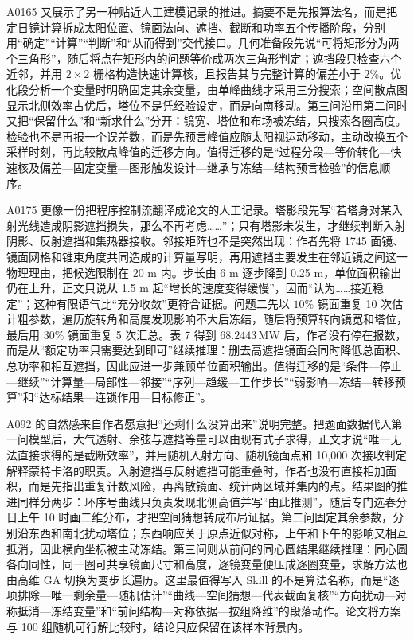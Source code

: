 \documentclass[UTF8,a4paper,12pt]{ctexart}
\begin{document}
A0165 又展示了另一种贴近人工建模记录的推进。摘要不是先报算法名，而是把定日镜计算拆成太阳位置、镜面法向、遮挡、截断和功率五个传播阶段，分别用“确定”“计算”“判断”和“从而得到”交代接口。几何准备段先说“可将矩形分为两个三角形”，随后将点在矩形内的问题等价成两次三角形判定；遮挡段只检查六个近邻，并用 $2\times2$ 栅格构造快速计算核，且报告其与完整计算的偏差小于 $2\%$。优化段分析一个变量时明确固定其余变量，由单峰曲线才采用三分搜索；空间散点图显示北侧效率占优后，塔位不是凭经验设定，而是向南移动。第三问沿用第二问时又把“保留什么”和“新求什么”分开：镜宽、塔位和布场被冻结，只搜索各圈高度。检验也不是再报一个误差数，而是先预言峰值应随太阳视运动移动，主动改换五个采样时刻，再比较散点峰值的迁移方向。值得迁移的是“过程分段—等价转化—快速核及偏差—固定变量—图形触发设计—继承与冻结—结构预言检验”的信息顺序。

A0175 更像一份把程序控制流翻译成论文的人工记录。塔影段先写“若塔身对某入射光线造成阴影遮挡损失，那么不再考虑……”；只有塔影未发生，才继续判断入射阴影、反射遮挡和集热器接收。邻接矩阵也不是突然出现：作者先将 1745 面镜、镜面网格和锥束角度共同造成的计算量写明，再用遮挡主要发生在邻近镜之间这一物理理由，把候选限制在 20 m 内。步长由 6 m 逐步降到 0.25 m，单位面积输出仍在上升，正文只说从 1.5 m 起“增长的速度变得缓慢”，因而“认为……接近稳定”；这种有限语气比“充分收敛”更符合证据。问题二先以 $10\%$ 镜面重复 10 次估计粗参数，遍历旋转角和高度发现影响不大后冻结，随后将预算转向镜宽和塔位，最后用 $30\%$ 镜面重复 5 次汇总。表 7 得到 $68.2443\,\mathrm{MW}$ 后，作者没有停在报数，而是从“额定功率只需要达到即可”继续推理：删去高遮挡镜面会同时降低总面积、总功率和相互遮挡，因此应进一步兼顾单位面积输出。值得迁移的是“条件—停止—继续”“计算量—局部性—邻接”“序列—趋缓—工作步长”“弱影响—冻结—转移预算”和“达标结果—连锁作用—目标修正”。

A092 的自然感来自作者愿意把“还剩什么没算出来”说明完整。把题面数据代入第一问模型后，大气透射、余弦与遮挡等量可以由现有式子求得，正文才说“唯一无法直接求得的是截断效率”，并用随机入射方向、随机镜面点和 10,000 次接收判定解释蒙特卡洛的职责。入射遮挡与反射遮挡可能重叠时，作者也没有直接相加面积，而是先指出重复计数风险，再离散镜面、统计两区域并集内的点。结果图的推进同样分两步：环序号曲线只负责发现北侧高值并写“由此推测”，随后专门选春分日上午 10 时画二维分布，才把空间猜想转成布局证据。第二问固定其余参数，分别沿东西和南北扰动塔位；东西响应关于原点近似对称，上午和下午的影响又相互抵消，因此横向坐标被主动冻结。第三问则从前问的同心圆结果继续推理：同心圆各向同性，同一圈可共享镜面尺寸和高度，逐镜变量便压成逐圈变量，求解方法也由高维 GA 切换为变步长遍历。这里最值得写入 Skill 的不是算法名称，而是“逐项排除—唯一剩余量—随机估计”“曲线—空间猜想—代表截面复核”“方向扰动—对称抵消—冻结变量”和“前问结构—对称依据—按组降维”的段落动作。论文将方案与 100 组随机可行解比较时，结论只应保留在该样本背景内。
\end{document}
